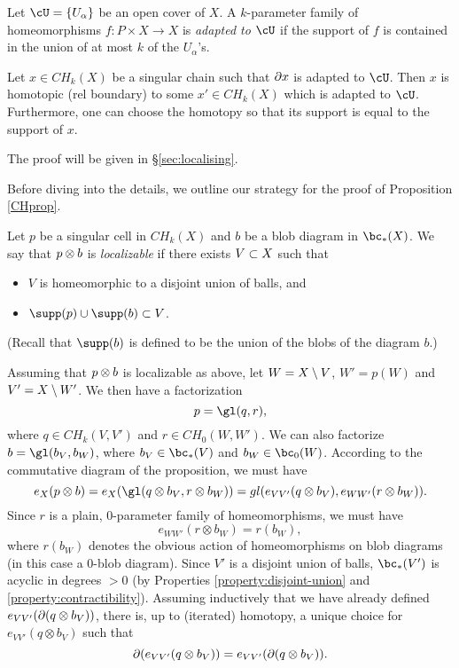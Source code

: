 Let $\cU = \{U_\alpha\}$ be an open cover of $X$.
A $k$-parameter family of homeomorphisms $f: P \times X \to X$ is
{\it adapted to $\cU$} 
if the support of $f$ is contained in the union
of at most $k$ of the $U_\alpha$'s.

\begin{lemma}  \label{extension_lemma}
Let $x \in CH_k(X)$ be a singular chain such that $\partial x$ is adapted to $\cU$.
Then $x$ is homotopic (rel boundary) to some $x' \in CH_k(X)$ which is adapted to $\cU$.
Furthermore, one can choose the homotopy so that its support is equal to the support of $x$.
\end{lemma}

The proof will be given in \S\ref{sec:localising}.

\medskip

Before diving into the details, we outline our strategy for the proof of Proposition \ref{CHprop}.

Let $p$ be a singular cell in $CH_k(X)$ and $b$ be a blob diagram in $\bc_*(X)$.
We say that $p\otimes b$ is {\it localizable} if there exists $V \subset X$ such that
\begin{itemize}
\item $V$ is homeomorphic to a disjoint union of balls, and
\item $\supp(p) \cup \supp(b) \sub V$.
\end{itemize}
(Recall that $\supp(b)$ is defined to be the union of the blobs of the diagram $b$.)

Assuming that $p\otimes b$ is localizable as above, 
let $W = X \setminus V$, $W' = p(W)$ and $V' = X\setminus W'$.
We then have a factorization 
\[
	p = \gl(q, r),
\]
where $q \in CH_k(V, V')$ and $r \in CH_0(W, W')$.
We can also factorize $b = \gl(b_V, b_W)$, where $b_V\in \bc_*(V)$ and $b_W\in\bc_0(W)$.
According to the commutative diagram of the proposition, we must have
\[
	e_X(p\otimes b) = e_X(\gl(q\otimes b_V, r\otimes b_W)) = 
				gl(e_{VV'}(q\otimes b_V), e_{WW'}(r\otimes b_W)) .
\]
Since $r$ is a plain, 0-parameter family of homeomorphisms, we must have
\[
	e_{WW'}(r\otimes b_W) = r(b_W),
\]
where $r(b_W)$ denotes the obvious action of homeomorphisms on blob diagrams (in
this case a 0-blob diagram).
Since $V'$ is a disjoint union of balls, $\bc_*(V')$ is acyclic in degrees $>0$ 
(by Properties \ref{property:disjoint-union} and \ref{property:contractibility}).
Assuming inductively that we have already defined $e_{VV'}(\partial(q\otimes b_V))$,
there is, up to (iterated) homotopy, a unique choice for $e_{VV'}(q\otimes b_V)$
such that 
\[
	\partial(e_{VV'}(q\otimes b_V)) = e_{VV'}(\partial(q\otimes b_V)) .
\]


